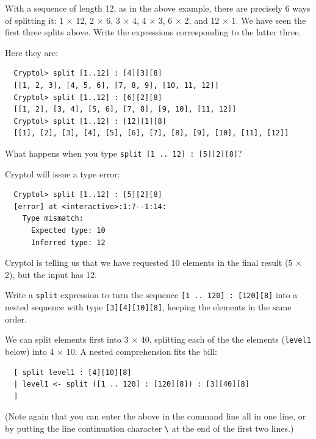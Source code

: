 \begin{Exercise}\label{ex:split:0}
  With a sequence of length 12, as in the above example, there are
  precisely 6 ways of splitting it: 1 $\times$ 12, 2 $\times$ 6, 3
  $\times$ 4, 4 $\times$ 3, 6 $\times$ 2, and 12 $\times$ 1. We have
  seen the first three splits above. Write the expressions
  corresponding to the latter three.\indSplit
\end{Exercise}
\begin{Answer}
Here they are:\indSplit
\begin{Verbatim}
  Cryptol> split [1..12] : [4][3][8]
  [[1, 2, 3], [4, 5, 6], [7, 8, 9], [10, 11, 12]]
  Cryptol> split [1..12] : [6][2][8]
  [[1, 2], [3, 4], [5, 6], [7, 8], [9, 10], [11, 12]]
  Cryptol> split [1..12] : [12][1][8]
  [[1], [2], [3], [4], [5], [6], [7], [8], [9], [10], [11], [12]]
\end{Verbatim}
\end{Answer}

\begin{Exercise}\label{ex:split:1}
  What happens when you type
  \texttt{split [1 ..\ 12] :\ [5][2][8]}?\indSplit
\end{Exercise}
\begin{Answer}
Cryptol will issue a type error:\indSplit
\begin{Verbatim}
  Cryptol> split [1..12] : [5][2][8]
  [error] at <interactive>:1:7--1:14:
    Type mismatch:
      Expected type: 10
      Inferred type: 12
\end{Verbatim}
Cryptol is telling us that we have requested 10 elements in the final
result (5 $\times$ 2), but the input has 12.
\end{Answer}

\begin{Exercise}\label{ex:split:2}
  Write a \texttt{split} expression to turn the sequence \texttt{[1 ..\ 120]
    :\ [120][8]} into a nested sequence with type {\tt [3][4][10][8]},
  keeping the elements in the same order.\indSplit {}  \indComp
\end{Exercise}
\begin{Answer}
  We can split elements first into 3 $\times$ 40, splitting each
  of the the elements ({\tt level1} below) into 4 $\times$ 10. A nested
  comprehension fits the bill:\indComp
\begin{Verbatim}
  [ split level1 : [4][10][8]
  | level1 <- split ([1 .. 120] : [120][8]) : [3][40][8]
  ]
\end{Verbatim}
(Note again that you can enter the above in the command line all in
one line, or by putting the line continuation character
\texttt{\textbackslash} at the end of the first two
lines.)\indLineCont {}
\end{Answer}

